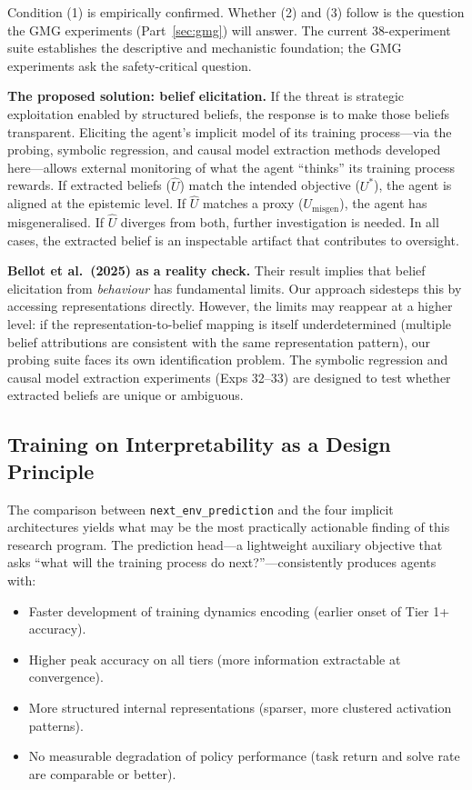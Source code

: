 \documentclass[11pt,a4paper]{article}
\theoremstyle{remark}
\newcommand{\Uhat}{\hat{U}}
\newcommand{\Ustar}{U^*}
\newcommand{\Umisgen}{U_{\text{misgen}}}
\begin{document}
Condition (1) is empirically confirmed. Whether (2) and (3) follow is the question the GMG experiments (Part~\ref{sec:gmg}) will answer. The current 38-experiment suite establishes the descriptive and mechanistic foundation; the GMG experiments ask the safety-critical question.

\textbf{The proposed solution: belief elicitation.} If the threat is strategic exploitation enabled by structured beliefs, the response is to make those beliefs transparent. Eliciting the agent's implicit model of its training process---via the probing, symbolic regression, and causal model extraction methods developed here---allows external monitoring of what the agent ``thinks'' its training process rewards. If extracted beliefs ($\Uhat$) match the intended objective ($\Ustar$), the agent is aligned at the epistemic level. If $\Uhat$ matches a proxy ($\Umisgen$), the agent has misgeneralised. If $\Uhat$ diverges from both, further investigation is needed. In all cases, the extracted belief is an inspectable artifact that contributes to oversight.

\textbf{Bellot et al.\ (2025) as a reality check.} Their result implies that belief elicitation from \textit{behaviour} has fundamental limits. Our approach sidesteps this by accessing representations directly. However, the limits may reappear at a higher level: if the representation-to-belief mapping is itself underdetermined (multiple belief attributions are consistent with the same representation pattern), our probing suite faces its own identification problem. The symbolic regression and causal model extraction experiments (Exps 32--33) are designed to test whether extracted beliefs are unique or ambiguous.

\subsection{Training on Interpretability as a Design Principle}

The comparison between \texttt{next\_env\_prediction} and the four implicit architectures yields what may be the most practically actionable finding of this research program. The prediction head---a lightweight auxiliary objective that asks ``what will the training process do next?''---consistently produces agents with:
\begin{itemize}[nosep]
    \item Faster development of training dynamics encoding (earlier onset of Tier 1+ accuracy).
    \item Higher peak accuracy on all tiers (more information extractable at convergence).
    \item More structured internal representations (sparser, more clustered activation patterns).
    \item No measurable degradation of policy performance (task return and solve rate are comparable or better).
\end{itemize}
\end{document}
